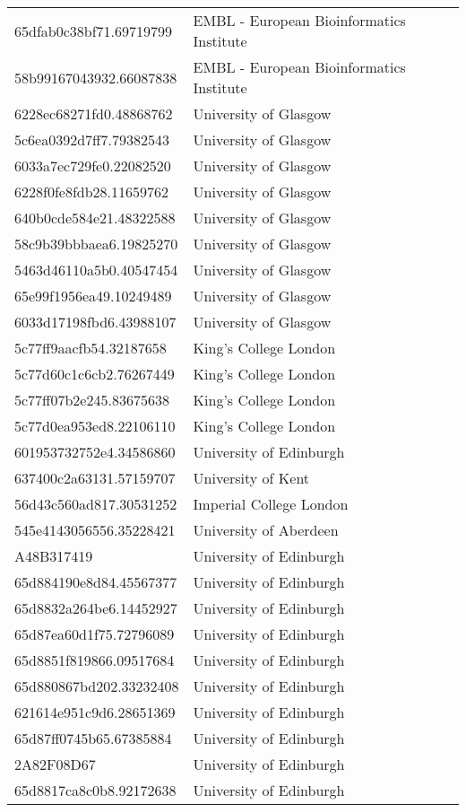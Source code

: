 \begin{tabular}{ll}
65dfab0c38bf71.69719799 & EMBL - European Bioinformatics Institute \\
58b99167043932.66087838 & EMBL - European Bioinformatics Institute \\
6228ec68271fd0.48868762 & University of Glasgow \\
5c6ea0392d7ff7.79382543 & University of Glasgow \\
6033a7ec729fe0.22082520 & University of Glasgow \\
6228f0fe8fdb28.11659762 & University of Glasgow \\
640b0cde584e21.48322588 & University of Glasgow \\
58c9b39bbbaea6.19825270 & University of Glasgow \\
5463d46110a5b0.40547454 & University of Glasgow \\
65e99f1956ea49.10249489 & University of Glasgow \\
6033d17198fbd6.43988107 & University of Glasgow \\
5c77ff9aacfb54.32187658 & King's College London \\
5c77d60c1c6cb2.76267449 & King's College London \\
5c77ff07b2e245.83675638 & King's College London \\
5c77d0ea953ed8.22106110 & King's College London \\
601953732752e4.34586860 & University of Edinburgh \\
637400c2a63131.57159707 & University of Kent \\
56d43c560ad817.30531252 & Imperial College London \\
545e4143056556.35228421 & University of Aberdeen \\
A48B317419 & University of Edinburgh \\
65d884190e8d84.45567377 & University of Edinburgh \\
65d8832a264be6.14452927 & University of Edinburgh \\
65d87ea60d1f75.72796089 & University of Edinburgh \\
65d8851f819866.09517684 & University of Edinburgh \\
65d880867bd202.33232408 & University of Edinburgh \\
621614e951c9d6.28651369 & University of Edinburgh \\
65d87ff0745b65.67385884 & University of Edinburgh \\
2A82F08D67 & University of Edinburgh \\
65d8817ca8c0b8.92172638 & University of Edinburgh \\

\end{tabular}
